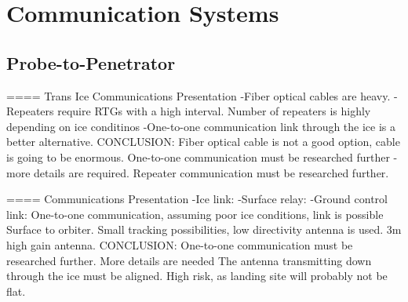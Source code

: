 \chapter{Communication Systems}





	

\section{Probe-to-Penetrator}




==== Trans Ice Communications Presentation
    -Fiber optical cables are heavy.
    -Repeaters require RTGs with a high interval. Number of repeaters is highly depending on ice conditinos
    -One-to-one communication link through the ice is a better alternative.
CONCLUSION: Fiber optical cable is not a good option, cable is going to be enormous.
            One-to-one communication must be researched further - more details are required.
            Repeater communication must be researched further.
            
==== Communications Presentation
-Ice link:
-Surface relay:
-Ground control link:
One-to-one communication, assuming poor ice conditions, link is possible
Surface to orbiter. Small tracking possibilities, low directivity antenna is used.
3m high gain antenna.
CONCLUSION: One-to-one communication must be researched further. More details are needed
            The antenna transmitting down through the ice must be aligned. High risk, as landing site will probably not be flat.
